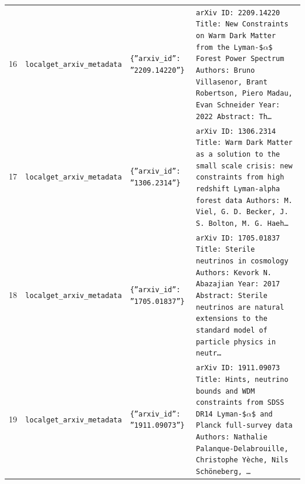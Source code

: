 \documentclass[11pt,a4paper]{article}
\begin{document}
\begin{longtable}{@{}p{}p{}p{}p{}@{}}
16 & \texttt{local}\newline\texttt{get\_\allowbreak{}arxiv\_\allowbreak{}metadata} & \texttt{\{''arxiv\_\allowbreak{}id'':\allowbreak{} ''2209.14220''\}\allowbreak{}} & \texttt{arXiv ID:\allowbreak{} 2209.14220 Title:\allowbreak{} New Constraints on Warm Dark Matter from the Lyman-\$$\alpha$\$ Forest Power Spectrum Authors:\allowbreak{} Bruno Villasenor,\allowbreak{} Brant Robertson,\allowbreak{} Piero Madau,\allowbreak{} Evan Schneider Year:\allowbreak{} 2022 Abstract:\allowbreak{} Th\ldots{}\allowbreak{}} \\
17 & \texttt{local}\newline\texttt{get\_\allowbreak{}arxiv\_\allowbreak{}metadata} & \texttt{\{''arxiv\_\allowbreak{}id'':\allowbreak{} ''1306.2314''\}\allowbreak{}} & \texttt{arXiv ID:\allowbreak{} 1306.2314 Title:\allowbreak{} Warm Dark Matter as a solution to the small scale crisis:\allowbreak{} new constraints from high redshift Lyman-alpha forest data Authors:\allowbreak{} M. Viel,\allowbreak{} G. D. Becker,\allowbreak{} J. S. Bolton,\allowbreak{} M. G. Haeh\ldots{}\allowbreak{}} \\
18 & \texttt{local}\newline\texttt{get\_\allowbreak{}arxiv\_\allowbreak{}metadata} & \texttt{\{''arxiv\_\allowbreak{}id'':\allowbreak{} ''1705.01837''\}\allowbreak{}} & \texttt{arXiv ID:\allowbreak{} 1705.01837 Title:\allowbreak{} Sterile neutrinos in cosmology Authors:\allowbreak{} Kevork N. Abazajian Year:\allowbreak{} 2017 Abstract:\allowbreak{} Sterile neutrinos are natural extensions to the standard model of particle physics in neutr\ldots{}\allowbreak{}} \\
19 & \texttt{local}\newline\texttt{get\_\allowbreak{}arxiv\_\allowbreak{}metadata} & \texttt{\{''arxiv\_\allowbreak{}id'':\allowbreak{} ''1911.09073''\}\allowbreak{}} & \texttt{arXiv ID:\allowbreak{} 1911.09073 Title:\allowbreak{} Hints,\allowbreak{} neutrino bounds and WDM constraints from SDSS DR14 Lyman-\$$\alpha$\$ and Planck full-survey data Authors:\allowbreak{} Nathalie Palanque-Delabrouille,\allowbreak{} Christophe Yèche,\allowbreak{} Nils Schöneberg,\allowbreak{} \ldots{}\allowbreak{}} \\

\end{longtable}
\end{document}
